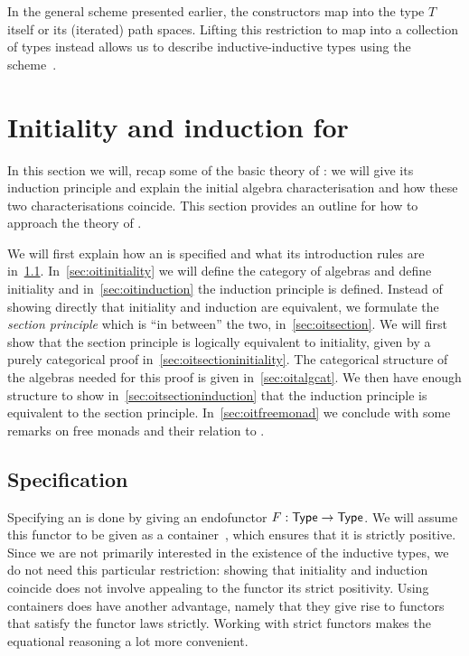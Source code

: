 \documentclass[a4paper,10pt]{report}
\begin{document}
In the general scheme presented earlier, the constructors map into the
type $T$ itself or its (iterated) path spaces. Lifting this
restriction to map into a collection of types instead allows us to
describe inductive-inductive types using the
scheme~\cite{Capriotti2014}.

\chapter{Initiality and induction for \oits}
\label{sec:oits}

In this section we will, recap some of the basic theory of \oits: we
will give its induction principle and explain the initial algebra
characterisation and how these two characterisations coincide. This
section provides an outline for how to approach the theory of \hits.

We will first explain how an \oit is specified and what its
introduction rules are in~\cref{sec:oitspec}.
In~\cref{sec:oitinitiality} we will define the category of algebras
and define initiality and in~\cref{sec:oitinduction} the induction
principle is defined. Instead of showing directly that initiality and
induction are equivalent, we formulate the \emph{section principle}
which is ``in between'' the two, in~\cref{sec:oitsection}. We will
first show that the section principle is logically equivalent to
initiality, given by a purely categorical proof
in~\cref{sec:oitsectioninitiality}. The categorical structure of the
algebras needed for this proof is given in~\cref{sec:oitalgcat}. We
then have enough structure to show in~\cref{sec:oitsectioninduction}
that the induction principle is equivalent to the section
principle. In~\cref{sec:oitfreemonad} we conclude with some remarks on
free monads and their relation to \oits.

\section{Specification}
\label{sec:oitspec}
Specifying an \oit is done by giving an endofunctor
$F : \mathsf{Type} \to \mathsf{Type}$. We will assume this functor to be given as a
container~\cite{Abbott2005}, which ensures that it is strictly
positive. Since we are not primarily interested in the existence of
the inductive types, we do not need this particular restriction:
showing that initiality and induction coincide does not involve
appealing to the functor its strict positivity. Using containers does
have another advantage, namely that they give rise to functors that
satisfy the functor laws strictly. Working with strict functors makes
the equational reasoning a lot more convenient.
\end{document}
